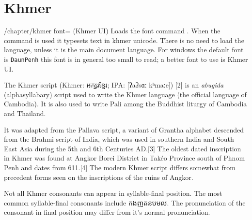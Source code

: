 \section{Khmer}
\newfontfamily{}
\normaltext

\def\khmerdefaultfont#1{\newfontfamily\khmer[Scale=MatchUppercase]{#1}}
\def\khmertext#1{{\khmer#1}}

\cxset{khmer font/.code=\khmerdefaultfont{#1}}



\begin{key}{/chapter/khmer font= (Khmer  UI)} Loads the font
command \cmd{\khmer}. When the command is used it typesets text in
khmer unicode. There is no need to load the language, unless it is the main document language. For windows the default font is \texttt{DaunPenh} this font is in general too small to read; a better font to use is Khmer UI.
\end{key}




The Khmer script (Khmer: {\Large\khmertext{អក្សរខ្មែរ}}; IPA: [ʔaʔsɑː kʰmaːe]) [2] is an \textit{abugida} (alphasyllabary) script used to write the Khmer language (the official language of Cambodia). It is also used to write Pali among the Buddhist liturgy of Cambodia and Thailand.

It was adapted from the Pallava script, a variant of Grantha alphabet descended from the Brahmi script of India, which was used in southern India and South East Asia during the 5th and 6th Centuries AD.[3] The oldest dated inscription in Khmer was found at Angkor Borei District in Takéo Province south of Phnom Penh and dates from 611.[4] The modern Khmer script differs somewhat from precedent forms seen on the inscriptions of the ruins of Angkor.

Not all Khmer consonants can appear in syllable-final position. The most common syllable-final consonants include {\khmer កងញតនបមល}. The pronunciation of the consonant in final position may differ from it's normal pronunciation.


